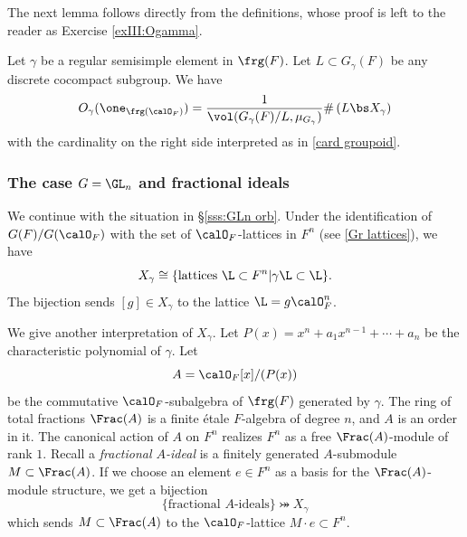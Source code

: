 The next lemma follows directly from the definitions, whose proof is left to the reader as Exercise \ref{exIII:Ogamma}.
\begin{lemma}\label{l:Ogamma} Let $\gamma$ be a regular semisimple element in $\frg(F)$. Let $L\subset G_{\gamma}(F)$ be any discrete cocompact subgroup. We have
\begin{equation*}
O_{\gamma}(\one_{\frg(\calO_{F})})=\frac{1}{\vol(G_{\gamma}(F)/L,\mu_{G_{\gamma}})}\#\left(L\bs X_{\gamma}\right)
\end{equation*}
with the cardinality on the right side interpreted as in \eqref{card groupoid}.
\end{lemma}





\subsubsection{The case $G=\GL_{n}$ and fractional ideals}\label{sss:GLn orb formula} We continue with the situation in \S\ref{sss:GLn orb}. Under the identification of $G(F)/G(\calO_{F})$ with the set of $\calO_{F}$-lattices in $F^{n}$ (see \eqref{Gr lattices}), we have
\begin{equation*}
X_{\gamma}\cong\{\textup{lattices }\L\subset F^{n}|\gamma \L\subset \L\}.
\end{equation*} 
The bijection sends $[g]\in X_{\gamma}$ to the lattice $\L=g\calO^{n}_{F}$. 

We give another interpretation of $X_{\gamma}$. Let $P(x)=x^{n}+a_{1}x^{n-1}+\cdots+a_{n}$ be the characteristic polynomial of $\gamma$. Let
\begin{equation*}
A=\calO_{F}[x]/(P(x))
\end{equation*}
be the commutative $\calO_{F}$-subalgebra of $\frg(F)$ generated by $\gamma$. The ring of total fractions $\Frac(A)$ is a finite \'etale $F$-algebra of degree $n$, and $A$ is an order in it. The canonical action of $A$ on $F^{n}$ realizes $F^{n}$ as a free $\Frac(A)$-module of rank $1$.  Recall a {\em fractional $A$-ideal} is a finitely generated $A$-submodule $M\subset \Frac(A)$. If we choose an element $e\in F^{n}$ as a basis for the $\Frac(A)$-module structure, we get a bijection
\begin{equation}\label{frac ideals}
\{\mbox{fractional $A$-ideals}\}\bij X_{\gamma}
\end{equation}
which sends $M\subset \Frac(A)$ to the $\calO_{F}$-lattice $M\cdot e\subset F^{n}$. 



